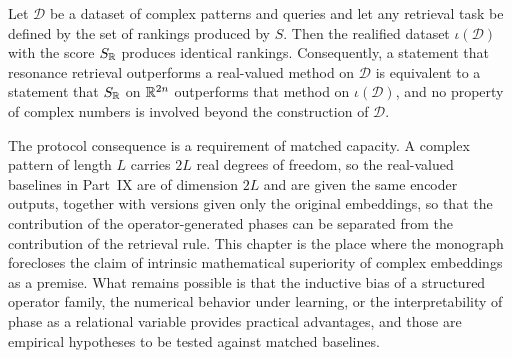 \begin{theorem}\label{thm:matched}
Let $\mathcal D$ be a dataset of complex patterns and queries and let any retrieval task be defined by the set of rankings produced by $S$. Then the realified dataset $\iota(\mathcal D)$ with the score $S_{\mathbb{R}}$ produces identical rankings. Consequently, a statement that resonance retrieval outperforms a real-valued method on $\mathcal D$ is equivalent to a statement that $S_{\mathbb{R}}$ on $\mathbb{R}^{2n}$ outperforms that method on $\iota(\mathcal D)$, and no property of complex numbers is involved beyond the construction of $\mathcal D$.
\end{theorem}

The protocol consequence is a requirement of matched capacity. A complex pattern of length $L$ carries $2L$ real degrees of freedom, so the real-valued baselines in Part~IX are of dimension $2L$ and are given the same encoder outputs, together with versions given only the original embeddings, so that the contribution of the operator-generated phases can be separated from the contribution of the retrieval rule. This chapter is the place where the monograph forecloses the claim of intrinsic mathematical superiority of complex embeddings as a premise. What remains possible is that the inductive bias of a structured operator family, the numerical behavior under learning, or the interpretability of phase as a relational variable provides practical advantages, and those are empirical hypotheses to be tested against matched baselines.
